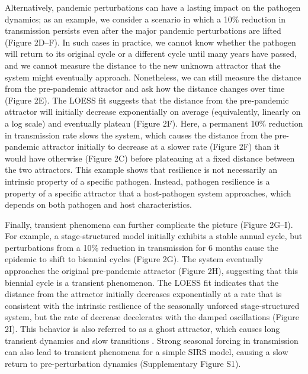 \documentclass[12pt]{article}
\newcommand{\comment}{\showcomment}
\newcommand{\showcomment}[3]{\textcolor{#1}{\textbf{[#2: }\textsl{#3}\textbf{]}}}
\newcommand{\swp}[1]{\comment{magenta}{SWP}{#1}}
\begin{document}
Alternatively, pandemic perturbations can have a lasting impact on the pathogen dynamics; 
as an example, we consider a scenario in which a 10\% reduction in transmission persists even after the major pandemic perturbations are lifted (Figure 2D--F).
In such cases in practice, we cannot know whether the pathogen will return to its original cycle or a different cycle until many years have passed, and we cannot measure the distance to the new unknown attractor that the system might eventually approach.
Nonetheless, we can still measure the distance from the pre-pandemic attractor and ask how the distance changes over time (Figure 2E).
The LOESS fit suggests that the distance from the pre-pandemic attractor will initially decrease exponentially on average (equivalently, linearly on a log scale) and eventually plateau (Figure 2F).
Here, a permanent 10\% reduction in transmission rate slows the system, which causes the distance from the pre-pandemic attractor initially to decrease at a slower rate (Figure 2F) than it would have otherwise (Figure 2C) before plateauing at a fixed distance between the two attractors.
This example shows that resilience is not necessarily an intrinsic property of a specific pathogen.
Instead, pathogen resilience is a property of a specific attractor that a host-pathogen system approaches, which depends on both pathogen and host characteristics.

Finally, transient phenomena can further complicate the picture (Figure 2G--I).
For example, a stage-structured model initially exhibits a stable annual cycle, but perturbations from a 10\% reduction in transmission for 6 months cause the epidemic to shift to biennial cycles (Figure 2G).
The system eventually approaches the original pre-pandemic attractor (Figure 2H), suggesting that this biennial cycle is a transient phenomenon.
The LOESS fit indicates that the distance from the attractor initially decreases exponentially at a rate that is consistent with the intrinsic resilience of the seasonally unforced stage-structured system, but the rate of decrease decelerates with the damped oscillations (Figure 2I).
This behavior is also referred to as a ghost attractor, which causes long transient dynamics and slow transitions \citep{hastings2018transient}.
Strong seasonal forcing in transmission can also lead to transient phenomena for a simple SIRS model, causing a slow return to pre-perturbation dynamics (Supplementary Figure S1).
\end{document}
